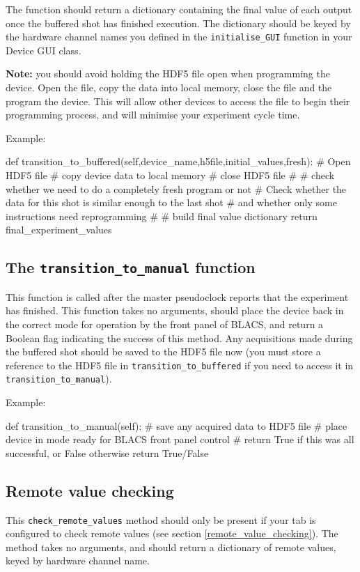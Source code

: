 \documentclass[12pt]{article}
\begin{document}
The function should return a dictionary containing the final value of each output once the buffered shot has finished execution.
The dictionary should be keyed by the hardware channel names you defined in the \texttt{initialise\_GUI} function in your Device GUI class.

\textbf{Note:} you should avoid holding the HDF5 file open when programming the device. Open the file, copy the data into local memory, close the file and the program the device.
This will allow other devices to access the file to begin their programming process, and will minimise your experiment cycle time.

Example:
\begin{python}
    def transition_to_buffered(self,device_name,h5file,initial_values,fresh):
        # Open HDF5 file
        # copy device data to local memory
        # close HDF5 file
        #
        # check whether we need to do a completely fresh program or not
        # Check whether the data for this shot is similar enough to the last shot
        #       and whether only some instructions need reprogramming
        # 
        # build final value dictionary
        return final_experiment_values
\end{python}

\subsection{The \texttt{transition\_to\_manual} function}
This function is called after the master pseudoclock reports that the experiment has finished. 
This function takes no arguments, should place the device back in the correct mode for operation by the front panel of BLACS, and return a Boolean flag indicating the success of this method.
Any acquisitions made during the buffered shot should be saved to the HDF5 file now (you must store a reference to the HDF5 file in \texttt{transition\_to\_buffered} if you need to access it in \texttt{transition\_to\_manual}).

Example:
\begin{python}
    def transition_to_manual(self):
        # save any acquired data to HDF5 file
        # place device in mode ready for BLACS front panel control
        # return True if this was all successful, or False otherwise
        return True/False
\end{python}

\subsection{Remote value checking}\label{worker:remote_value_checking}
This \texttt{check\_remote\_values} method should only be present if your tab is configured to check remote values (see section \ref{remote_value_checking}).
The method takes no arguments, and should return a dictionary of remote values, keyed by hardware channel name.
\end{document}
